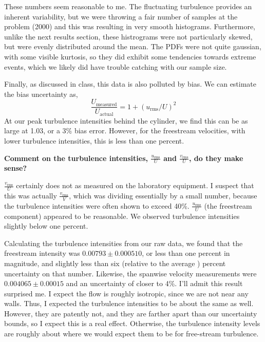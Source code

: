 \documentclass{article}
\begin{document}
These numbers seem reasonable to me. The fluctuating turbulence
provides an inherent variability, but we were throwing a fair number of
samples at the problem (2000) and this was resulting in very smooth
histograms. Furthermore, unlike the next results section, these
histrograms were not particularly skewed, but were evenly distributed
around the mean. The PDFs were not quite gaussian, with some visible
kurtosis, so they did exhibit some tendencies towards extreme events,
which we likely did have trouble catching with our sample
size.

Finally, as discussed in class, this data is also polluted by bias. 
We can estimate the bias uncertainty as,
\begin{equation}
  \frac{U_\text{measured}}{U_\text{actual}} = 1 + \left(u_{\text{rms}}/U\right)^2
\end{equation}
At our peak turbulence intensities behind the cylinder, we find this can be as large at 1.03, or a 3\% bias error.
However, for the freestream velocities, with lower turbulence intensities, this is less than one percent. 


\textbf{Comment on the turbulence intensities,
$\frac{u_{\text{rms}}}{U}$ and $\frac{v_{\text{rms}}}{U}$, do they make sense?}

$\frac{v_{\text{rms}}}{U}$ certainly does not as measured on the
laboratory equipment. I suspect that this was actually
$\frac{v_{\text{rms}}}{V}$, which was dividing essentially by a small number,
because the turbulence intensities were often shown to exceed 40\%. 
$\frac{u_{\text{rms}}}{U}$ (the freestream component) appeared to be
reasonable. We observed turbulence intensities slightly below one
percent. 

Calculating the turbulence intensities from our raw data, we found that
the freestream intensity was $0.00793 \pm 0.000510$, or less than one
percent in magnitude, and slightly less than six (relative to the
average ) percent uncertainty on that number. Likewise, the spanwise
velocity measurements were $0.004065 \pm 0.00015$ and an uncertainty of
closer to 4\%. I'll admit this result surprised me.
I expect the flow is roughly isotropic, since we are not near any walls. 
Thus, I expected the turbulence intensities to be about the same as
well. However, they are patently not, and they are farther apart than
our uncertainty bounds, so I expect this is a real effect. Otherwise,
the turbulence intensity levels are roughly about where we would expect
them to be for free-stream turbulence. 
\end{document}
